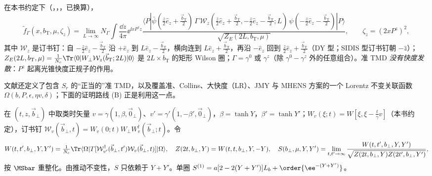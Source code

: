 \begin{definition}[准 TMD]\label{def:lamet-quasi-tmd}
在本书约定下（\cite{Ji:2019ewn}，\cite[第~3~节]{Liu:2022nnk}，\cite{Ebert:2022fmh}，已换算），
\begin{equation}\label{eq:lamet-quasi-tmd}
\tilde f_\Gamma(x,b_{\mathrm T},\mu,\zeta_z)=\lim_{L\to\infty}N_\Gamma\int\frac{\dd z}{4\pi}\ee^{\ii xP^zz}\frac{\langle P|\bar\psi(\frac z2\hat e_z+\frac{\vec b_{\mathrm T}}2)\,\Gamma\,\mathcal W_z(\tfrac z2\hat e_z+\tfrac{\vec b_{\mathrm T}}2,-\tfrac z2\hat e_z-\tfrac{\vec b_{\mathrm T}}2;L)\,\psi(-\frac z2\hat e_z-\frac{\vec b_{\mathrm T}}2)|P\rangle}{\sqrt{Z_E(2L,b_{\mathrm T},\mu)}},\qquad\zeta_z=(2xP^z)^2,
\end{equation}
其中 $\mathcal W_z$ 是订书钉：自 $-\frac z2\hat e_z-\frac{\vec b_{\mathrm T}}2$ 沿 $+\hat e_z$ 到 $L\hat e_z-\frac{\vec b_{\mathrm T}}2$，横向连到 $L\hat e_z+\frac{\vec b_{\mathrm T}}2$，再沿 $-\hat e_z$ 回到 $\frac z2\hat e_z+\frac{\vec b_{\mathrm T}}2$（DY 型；SIDIS 型订书钉朝 $-\hat z$）；$Z_E(2L,b_{\mathrm T},\mu)=\frac1{N_c}\Tr\langle0|W_\perp\mathcal W_z(\vec b_{\mathrm T};2L)|0\rangle$ 是 $2L\times b_{\mathrm T}$ 的矩形 Wilson 圈；$\Gamma=\gamma^0$ 或 $\gamma^z$（除 $\gamma^0-\gamma^z$ 外的任意组合）。准 TMD \emph{没有快度发散}：$P^z$ 起离光锥快度正规子的作用。
\end{definition}

文献\cite{Ebert:2022fmh}还定义了包含 $S_r$ 的“正当的”准 TMD，以及覆盖准、Collins、大快度（LR）、JMY 与 MHENS 方案的一个 Lorentz 不变关联函数 $\Omega(b,P,\epsilon,\eta v,\delta)$；下面的证明路线 (B) 正是利用这一点。

\begin{definition}\label{def:lamet-soft-offlc}
在 $(t,z,\vec b_\perp)$ 中取类时矢量 $v=\gamma(1,\beta,\vec0_\perp)$、$v'=\gamma'(1,-\beta',\vec0_\perp)$，$\beta=\tanh Y$，$\beta'=\tanh Y'$；$W_v(\xi;t)=W[\xi,\xi-\frac t\gamma v]$（本书约定），订书钉 $\mathcal W_v(\vec b_\perp,t)=W_v(0;t)W_\perp W_v^\dagger(\vec b_\perp;t)$。令
\begin{equation}\label{eq:lamet-soft-offlc}
W(t,t',b_\perp,Y,Y')=\tfrac1{N_c}\Tr\langle\Omega|T[\mathcal W^\dagger_{v'}(\vec b_\perp,t')\mathcal W_v(\vec b_\perp,t)]|\Omega\rangle,\quad Z(2t,b_\perp,Y)=W(t,t,b_\perp,Y,-Y),\quad S(b_\perp,\mu,Y,Y')=\lim_{t,t'\to\infty}\frac{W(t,t',b_\perp,Y,Y')}{\sqrt{Z(2t,b_\perp,Y)Z(2t',b_\perp,Y')}},
\end{equation}
按 $\MSbar$ 重整化。由推动不变性，$S$ 只依赖于 $Y+Y'$。单圈 $S^{(1)}=a[2-2(Y+Y')]L_b+\order{\ee^{-(Y+Y')}}$。%
\end{definition}

